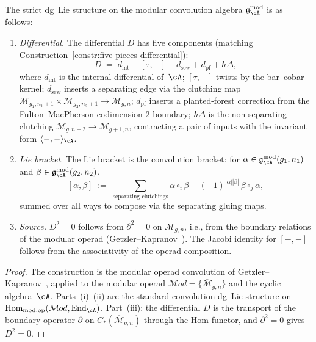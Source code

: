 \begin{theorem}
\label{thm:convolution-dg-lie-structure}
The strict dg~Lie structure on the modular convolution algebra
$\mathfrak{g}_{\cA}^{\mathrm{mod}}$ is as follows:
\begin{enumerate}[label=\textup{(\roman*)}]
\item \emph{Differential.}
  The differential $D$ has five components
  \textup{(}matching Construction~\textup{\ref{constr:five-pieces-differential})}:
  \begin{equation}\label{eq:D-five-components}
  D
  \;=\;
  d_{\mathrm{int}} + [\tau,-] + d_{\mathrm{sew}}
  + d_{\mathrm{pf}} + \hbar\Delta,
  \end{equation}
  where $d_{\mathrm{int}}$ is the internal differential of~$\cA$;
  $[\tau,-]$ twists by the bar--cobar kernel;
  $d_{\mathrm{sew}}$ inserts a separating edge via the clutching
  map $\overline{\mathcal{M}}_{g_1,n_1+1} \times
  \overline{\mathcal{M}}_{g_2,n_2+1} \to
  \overline{\mathcal{M}}_{g,n}$;
  $d_{\mathrm{pf}}$ inserts a planted-forest correction from the
  Fulton--MacPherson codimension-$2$ boundary;
  $\hbar\Delta$ is the non-separating clutching
  $\overline{\mathcal{M}}_{g,n+2} \to
  \overline{\mathcal{M}}_{g+1,n}$,
  contracting a pair of inputs with the invariant form
  $\langle -, - \rangle_{\cA}$.

\item \emph{Lie bracket.}
  The Lie bracket is the convolution bracket: for
  $\alpha \in \mathfrak{g}_{\cA}^{\mathrm{mod}}(g_1,n_1)$ and
  $\beta \in \mathfrak{g}_{\cA}^{\mathrm{mod}}(g_2,n_2)$,
  \[
  [\alpha,\beta]
  \;:=\;
  \sum_{\text{separating clutchings}}
  \alpha \circ_i \beta
  - (-1)^{|\alpha||\beta|}\, \beta \circ_j \alpha,
  \]
  summed over all ways to compose via the separating gluing maps.

\item \emph{Source.}  $D^2 = 0$ follows from $\partial^2 = 0$ on
  $\overline{\mathcal{M}}_{g,n}$, i.e., from the boundary
  relations of the modular operad
  \textup{(}Getzler--Kapranov~\textup{\cite[\S5]{GeK98})}.
  The Jacobi identity for $[-,-]$ follows from the associativity of
  the operad composition.
\end{enumerate}
\end{theorem}

\begin{proof}
The construction is the modular operad convolution of
Getzler--Kapranov~\cite[\S4--5]{GeK98}, applied to the modular
operad $\mathcal{M}od = \{\overline{\mathcal{M}}_{g,n}\}$ and
the cyclic algebra~$\cA$.  Parts~(i)--(ii) are the standard
convolution dg~Lie structure on
$\operatorname{Hom}_{\mathrm{mod.op}}(\mathcal{M}od,
\operatorname{End}_{\cA})$.  Part~(iii): the differential
$D$ is the transport of the boundary operator $\partial$ on
$C_*(\overline{\mathcal{M}}_{g,n})$ through the Hom functor,
and $\partial^2 = 0$ gives $D^2 = 0$.
\end{proof}

